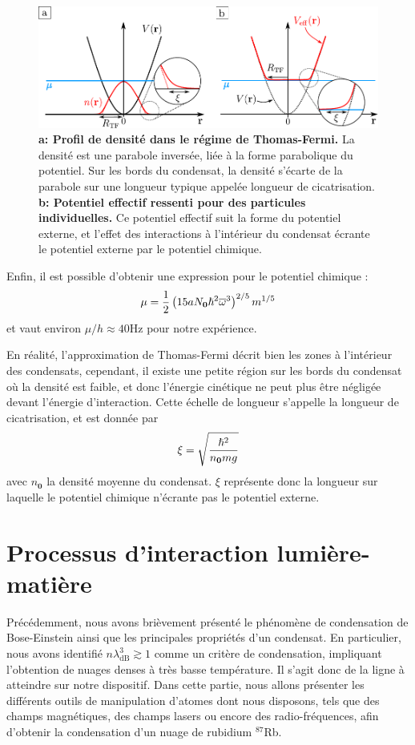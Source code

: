 \begin{figure}
\centering
\includegraphics[width=\textwidth]{Fig/BEC_manip/thomas_fermi.pdf}
\caption{\textbf{a: Profil de densité dans le régime de Thomas-Fermi.} La densité est une parabole inversée, liée à la forme parabolique du potentiel. Sur les bords du condensat, la densité s'écarte de la parabole sur une longueur typique appelée longueur de cicatrisation. \textbf{b: Potentiel effectif ressenti pour des particules individuelles.} Ce potentiel effectif suit la forme du potentiel externe, et l'effet des interactions à l'intérieur du condensat écrante le potentiel externe par le potentiel chimique.}
\label{fig:thomas_fermi}
\end{figure}
Enfin, il est possible d'obtenir une expression pour le potentiel chimique \citep{pethick2008bose}: 
\begin{equation}
\mu=\frac{1}{2} \left( 15a N_{\mathbf{0}} \hslash^2 \overline{\omega}^3 \right) ^{2/5} m^{1/5}
\end{equation}
et vaut environ $\mu/h\approx40$Hz pour notre expérience.

En réalité, l'approximation de Thomas-Fermi décrit bien les zones à l'intérieur des condensats, cependant, il existe une petite région sur les bords du condensat où la densité est faible, et donc l'énergie cinétique ne peut plus être négligée devant l'énergie d'interaction. Cette échelle de longueur s'appelle la longueur de cicatrisation, et est donnée par 
\begin{equation}
\xi=\sqrt{\frac{\hslash^2}{n_{\mathbf{0}} mg}}
\end{equation}
avec $n_{\mathbf{0}}$ la densité moyenne du condensat. $\xi$ représente donc la longueur sur laquelle le potentiel chimique n'écrante pas le potentiel externe.


\section{Processus d'interaction lumière-matière}
Précédemment, nous avons brièvement présenté le phénomène de condensation de Bose-Einstein ainsi que les principales propriétés d'un condensat. En particulier, nous avons identifié $n \lambda_{\mathrm{dB}}^3 \gtrsim 1$ comme un critère de condensation, impliquant l'obtention de nuages denses à très basse température. Il s'agit donc de la ligne à atteindre sur notre dispositif. Dans cette partie, nous allons présenter les différents outils de manipulation d'atomes dont nous disposons, tels que des champs magnétiques, des champs lasers ou encore des radio-fréquences, afin d'obtenir la condensation d'un nuage de rubidium ${}^{87}$Rb.

